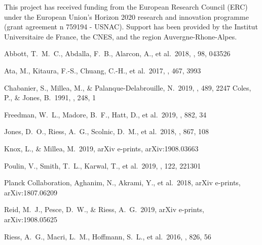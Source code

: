 \documentclass[]{aa} %
\begin{document}
\begin{acknowledgements}
    This project has received funding from the European Research Council (ERC) under the European Union's Horizon 2020 research and innovation programme (grant agreement n 759194 - USNAC). Support has been provided by the Institut Universitaire de France, the CNES, and the region Auvergne-Rhone-Alpes.
\end{acknowledgements}

\begin{thebibliography}{} 
 Abbott, T.~M.~C., Abdalla, F.~B., Alarcon, A., et al.\ 2018, \prd, 98, 043526

 Ata, M., Kitaura, F.-S., Chuang, C.-H., et al.\ 2017, \mnras, 467, 3993


 Chabanier, S., Millea, M., \& Palanque-Delabrouille, N.\ 2019, \mnras, 489, 2247
 Coles, P., \& Jones, B.\ 1991, \mnras, 248, 1


 Freedman, W.~L., Madore, B.~F., Hatt, D., et al.\ 2019, \apj, 882, 34



 Jones, D.~O., Riess, A.~G., Scolnic, D.~M., et al.\ 2018, \apj, 867, 108


 Knox, L., \& Millea, M.\ 2019, arXiv e-prints, arXiv:1908.03663


 Poulin, V., Smith, T.~L., Karwal, T., et al.\ 2019, \prl, 122, 221301

 Planck Collaboration, Aghanim, N., Akrami, Y., et al.\ 2018, arXiv e-prints, arXiv:1807.06209

 Reid, M.~J., Pesce, D.~W., \& Riess, A.~G.\ 2019, arXiv e-prints, arXiv:1908.05625


 Riess, A.~G., Macri, L.~M., Hoffmann, S.~L., et al.\ 2016, \apj, 826, 56


\end{thebibliography}
\end{document}
